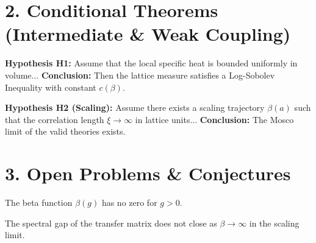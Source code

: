 \section*{2. Conditional Theorems (Intermediate \& Weak Coupling)}

\begin{theorem}
\label{thm:conditional-lsi}
\textbf{Hypothesis H1:} Assume that the local specific heat is bounded uniformly in volume...
\textbf{Conclusion:} Then the lattice measure satisfies a Log-Sobolev Inequality with constant $c(\beta)$.
\end{theorem}

\begin{theorem}
\label{thm:continuum-existence-registry}
\textbf{Hypothesis H2 (Scaling):} Assume there exists a scaling trajectory $\beta(a)$ such that the correlation length $\xi \to \infty$ in lattice units...
\textbf{Conclusion:} The Mosco limit of the valid theories exists.
\end{theorem}

\section*{3. Open Problems \& Conjectures}

\begin{conjecture}
The beta function $\beta(g)$ has no zero for $g > 0$.
\end{conjecture}

\begin{conjecture}
The spectral gap of the transfer matrix does not close as $\beta \to \infty$ in the scaling limit.
\end{conjecture}
